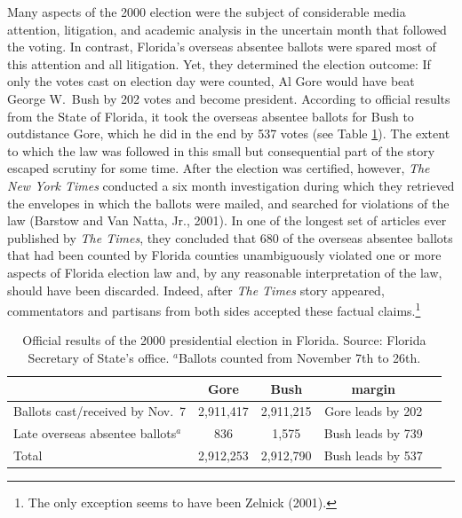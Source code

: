 \documentclass[11pt,titlepage]{article}
\begin{document}
Many aspects of the 2000 election were the subject of considerable
media attention, litigation, and academic analysis in the uncertain
month that followed the voting.
In contrast, Florida's overseas absentee ballots were spared most of
this attention and all litigation.  Yet, they determined the election
outcome: If only the votes cast on election day were counted, Al Gore
would have beat George W.\ Bush by 202 votes and become president.
According to official results from the State of Florida, it took the
overseas absentee ballots for Bush to outdistance Gore, which he did
in the end by 537 votes (see Table \ref{tb:official}).  The extent to
which the law was followed in this small but consequential part of the
story escaped scrutiny for some time. After the election was
certified, however, \emph{The New York Times} conducted a six month
investigation during which they retrieved the envelopes in which the
ballots were mailed, and searched for violations of the law (Barstow
and Van Natta, Jr., 2001).  In one of the longest set of articles ever
published by \emph{The Times}, they concluded that 680 of the overseas
absentee ballots that had been counted by Florida counties
unambiguously violated one or more aspects of Florida election law
and, by any reasonable interpretation of the law, should have been
discarded.  Indeed, after \emph{The Times} story appeared,
commentators and partisans from both sides accepted these factual
claims.\footnote{The only exception seems to have been Zelnick
  (2001)\nocite{Zelnick01}.}
\begin{table}[t]
\begin{center}
\begin{tabular}{lcccc}
                               & Gore      & Bush      & margin \\ \hline 
Ballots cast/received by Nov.\ 7&2,911,417 & 2,911,215 & Gore leads by 202 \\
Late overseas absentee ballots$^a$ &   836 &     1,575 & Bush leads by 739 \\
\hline
Total                          & 2,912,253 & 2,912,790 & Bush leads by 537 \\
\end{tabular} \caption{Official results of the 2000 presidential
  election in Florida.  Source: Florida Secretary of State's office.
  $^a$Ballots counted from November 7th to 26th.}
\label{tb:official}
\end{center}
\end{table} 
\end{document}
